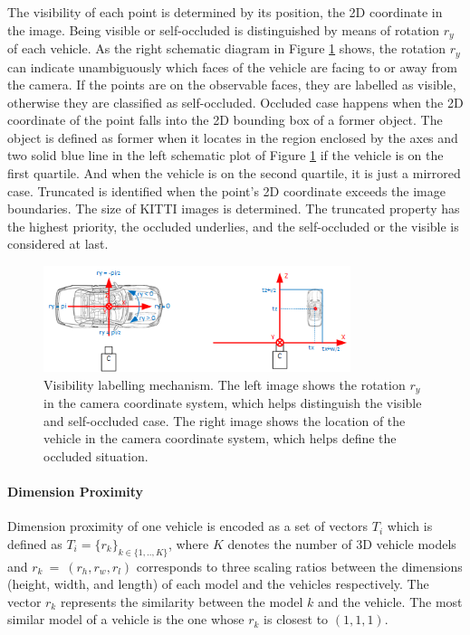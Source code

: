 \documentclass[a4paper,12pt]{article}
\begin{document}
The visibility of each point is determined by its position, \ie the 2D coordinate in the image.  Being visible or self-occluded is distinguished by means of rotation $r_y$ of each vehicle. As the right schematic diagram in Figure \ref{visibility_imp} shows, the rotation $r_y$ can indicate unambiguously which faces of the vehicle are facing to or away from the camera. If the points are on the observable faces, they  are labelled as visible,  otherwise they are classified as self-occluded. Occluded case happens when the 2D coordinate of the point falls into the 2D bounding box of a former object. The object is defined as former when it locates in the region enclosed by the axes and two solid blue line in the left schematic plot of Figure \ref{visibility_imp} if the vehicle is on the first quartile.  And when the vehicle is on the second quartile, it is just a mirrored case. Truncated is identified when the point's 2D coordinate exceeds the image boundaries. The size of KITTI images is determined. The truncated property has the highest priority, the occluded underlies, and the self-occluded or the visible is considered at last.

\begin{figure}[H]		
	\includegraphics[width=0.8\textwidth]{visibility_imp.png}
	\caption[Visibility labelling mechanism]{Visibility labelling mechanism. The left image shows the rotation $r_y$ in the camera coordinate system, which helps distinguish the visible and self-occluded case. The right image shows the location of the vehicle in the camera coordinate system, which helps define the occluded situation.}
	\centering
	\label{visibility_imp}
\end{figure}



\paragraph{Dimension Proximity}
\label{template}

Dimension proximity of one vehicle is encoded as a set of vectors $\mathit{T_{i}}$ which is defined as $\mathit{T}_i = \{r_k\}_{k \in \{1,.., K\}}$, where $\mathit{K}$ denotes the number of 3D vehicle models and  $r_k~=~(r_h,r_w,r_l)$ corresponds to three scaling ratios between the dimensions (\ie height, width, and length) of each model and the vehicles respectively. The vector $\mathit{r_k}$ represents the similarity between the model $k$ and the vehicle. The most similar model of a vehicle is the one whose $r_k$ is closest to $(1, 1, 1)$.
\end{document}
